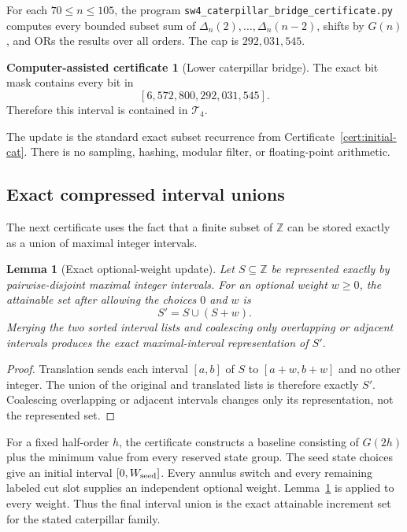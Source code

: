 \documentclass[11pt]{article}
\newtheorem{lemma}[theorem]{Lemma}
\theoremstyle{definition}
\newtheorem{certificate}[theorem]{Computer-assisted certificate}
\theoremstyle{remark}
\newcommand{\Tfour}{\mathcal T_4}
\newcommand{\interval}[2]{\left[#1,#2\right]}
\newcommand{\code}[1]{\nolinkurl{#1}}
\begin{document}
For each $70\le n\le105$, the program
\code{sw4_caterpillar_bridge_certificate.py} computes every bounded subset
sum of $\Delta_n(2),\ldots,\Delta_n(n-2)$, shifts by $G(n)$, and ORs the
results over all orders.  The cap is $292{,}031{,}545$.

\begin{certificate}[Lower caterpillar bridge]\label{cert:lower-bridge}
The exact bit mask contains every bit in
\[
  \interval{6{,}572{,}800}{292{,}031{,}545}.
\]
Therefore this interval is contained in $\Tfour$.
\end{certificate}

The update is the standard exact subset recurrence from
Certificate~\ref{cert:initial-cat}.  There is no sampling, hashing, modular
filter, or floating-point arithmetic.

\subsection{Exact compressed interval unions}

The next certificate uses the fact that a finite subset of $\mathbb Z$ can be
stored exactly as a union of maximal integer intervals.

\begin{lemma}[Exact optional-weight update]\label{lem:interval-update}
Let $S\subseteq\mathbb Z$ be represented exactly by pairwise-disjoint maximal
integer intervals.  For an optional weight $w\ge0$, the attainable set after
allowing the choices $0$ and $w$ is
\[
  S'=S\cup(S+w).
\]
Merging the two sorted interval lists and coalescing only overlapping or
adjacent intervals produces the exact maximal-interval representation of
$S'$.
\end{lemma}

\begin{proof}
Translation sends each interval $[a,b]$ of $S$ to $[a+w,b+w]$ and no other
integer.  The union of the original and translated lists is therefore exactly
$S'$.  Coalescing overlapping or adjacent intervals changes only its
representation, not the represented set.
\end{proof}

For a fixed half-order $h$, the certificate constructs a baseline consisting
of $G(2h)$ plus the minimum value from every reserved state group.  The seed
state choices give an initial interval $[0,W_{\rm seed}]$.  Every annulus
switch and every remaining labeled cut slot supplies an independent optional
weight.  Lemma~\ref{lem:interval-update} is applied to every weight.  Thus the
final interval union is the exact attainable increment set for the stated
caterpillar family.
\end{document}
